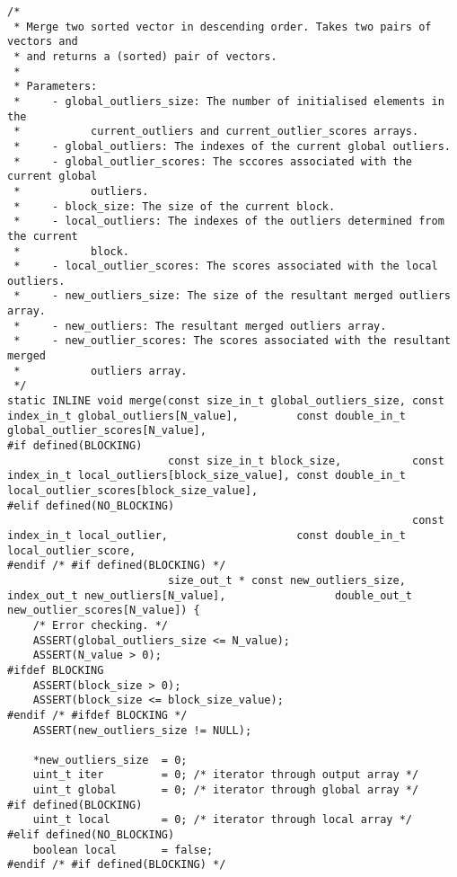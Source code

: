\begin{lstlisting}
/*
 * Merge two sorted vector in descending order. Takes two pairs of vectors and
 * and returns a (sorted) pair of vectors.
 *
 * Parameters:
 *     - global_outliers_size: The number of initialised elements in the 
 *           current_outliers and current_outlier_scores arrays.
 *     - global_outliers: The indexes of the current global outliers.
 *     - global_outlier_scores: The sccores associated with the current global
 *           outliers.
 *     - block_size: The size of the current block.
 *     - local_outliers: The indexes of the outliers determined from the current
 *           block.
 *     - local_outlier_scores: The scores associated with the local outliers.
 *     - new_outliers_size: The size of the resultant merged outliers array.
 *     - new_outliers: The resultant merged outliers array.
 *     - new_outlier_scores: The scores associated with the resultant merged 
 *           outliers array.
 */
static INLINE void merge(const size_in_t global_outliers_size, const index_in_t global_outliers[N_value],         const double_in_t global_outlier_scores[N_value],
#if defined(BLOCKING)
                         const size_in_t block_size,           const index_in_t local_outliers[block_size_value], const double_in_t local_outlier_scores[block_size_value],
#elif defined(NO_BLOCKING)
                                                               const index_in_t local_outlier,                    const double_in_t local_outlier_score,
#endif /* #if defined(BLOCKING) */
                         size_out_t * const new_outliers_size, index_out_t new_outliers[N_value],                 double_out_t new_outlier_scores[N_value]) {
    /* Error checking. */
    ASSERT(global_outliers_size <= N_value);
    ASSERT(N_value > 0);
#ifdef BLOCKING
    ASSERT(block_size > 0);
    ASSERT(block_size <= block_size_value);
#endif /* #ifdef BLOCKING */
    ASSERT(new_outliers_size != NULL);
    
    *new_outliers_size  = 0;
    uint_t iter         = 0; /* iterator through output array */
    uint_t global       = 0; /* iterator through global array */
#if defined(BLOCKING)
    uint_t local        = 0; /* iterator through local array */
#elif defined(NO_BLOCKING)
    boolean local       = false;
#endif /* #if defined(BLOCKING) */
    

\end{lstlisting}
